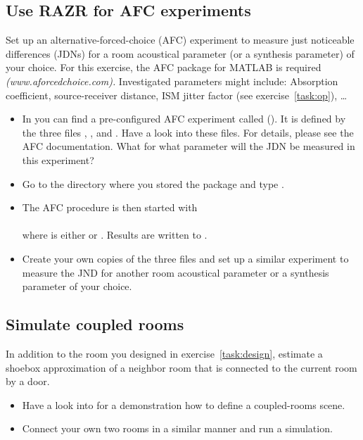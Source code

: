 \documentclass[a4paper, fleqn, 11pt]{article}
\begin{document}
\subsection{Use RAZR for AFC experiments}
Set up an alternative-forced-choice (AFC) experiment to measure just noticeable differences (JDNs) for a room acoustical parameter (or a synthesis parameter) of your choice. For this exercise, the AFC package for MATLAB is required \textit{(www.aforcedchoice.com).} Investigated parameters might include: Absorption coefficient, source-receiver distance, ISM jitter factor (see exercise~\ref{task:op}), \dots
\begin{itemize}
  \item In  you can find a pre-configured AFC experiment called  (). It is defined by the three files , , and . Have a look into these files. For details, please see the AFC documentation. What for what parameter will the JDN be measured in this experiment?
  \item Go to the directory where you stored the  package and type .
  \item The AFC procedure is then started with\\
  \\
  where  is either  or . Results are written to .
  \item Create your own copies of the three files  and set up a similar experiment to measure the JND for another room acoustical parameter or a synthesis parameter of your choice.
\end{itemize}

\subsection{Simulate coupled rooms}
In addition to the room you designed in exercise~\ref{task:design}, estimate a shoebox approximation of a neighbor room that is connected to the current room by a door.
\begin{itemize}
    \item Have a look into  for a demonstration how to define a coupled-rooms scene.
    \item Connect your own two rooms in a similar manner and run a simulation.
\end{itemize}
\end{document}
